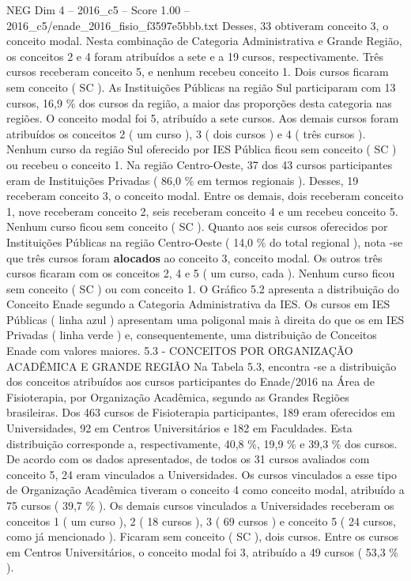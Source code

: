 \begin{textsample}{NEG Dim 4 – 2016\_c5 – Score 1.00 – 2016\_c5/enade\_2016\_fisio\_f3597e5bbb.txt}
Desses, 33 obtiveram conceito 3, o conceito modal.
Nesta combinação de Categoria Administrativa e Grande Região, os conceitos 2 e 4 foram atribuídos a sete e a 19 cursos, respectivamente.
Três cursos receberam conceito 5, e nenhum recebeu conceito 1.
Dois cursos ficaram sem conceito ( SC ).
As Instituições Públicas na região Sul participaram com 13 cursos, 16,9 \% dos cursos da região, a maior das proporções desta categoria nas regiões.
O conceito modal foi 5, atribuído a sete cursos.
Aos demais cursos foram atribuídos os conceitos 2 ( um curso ), 3 ( dois cursos ) e 4 ( três cursos ).
Nenhum curso da região Sul oferecido por IES Pública ficou sem conceito ( SC ) ou recebeu o conceito 1.
Na região Centro-Oeste, 37 dos 43 cursos participantes eram de Instituições Privadas ( 86,0 \% em termos regionais ).
Desses, 19 receberam conceito 3, o conceito modal.
Entre os demais, dois receberam conceito 1, nove receberam conceito 2, seis receberam conceito 4 e um recebeu conceito 5.
Nenhum curso ficou sem conceito ( SC ).
Quanto aos seis cursos oferecidos por Instituições Públicas na região Centro-Oeste ( 14,0 \% do total regional ), nota -se que três cursos foram \textbf{alocados} ao conceito 3, conceito modal.
Os outros três cursos ficaram com os conceitos 2, 4 e 5 ( um curso, cada ).
Nenhum curso ficou sem conceito ( SC ) ou com conceito 1.
O Gráfico 5.2 apresenta a distribuição do Conceito Enade segundo a Categoria Administrativa da IES.
Os cursos em IES Públicas ( linha azul ) apresentam uma poligonal mais à direita do que os em IES Privadas ( linha verde ) e, consequentemente, uma distribuição de Conceitos Enade com valores maiores. 5.3 - CONCEITOS POR ORGANIZAÇÃO ACADÊMICA E GRANDE REGIÃO Na Tabela 5.3, encontra -se a distribuição dos conceitos atribuídos aos cursos participantes do Enade/2016 na Área de Fisioterapia, por Organização Acadêmica, segundo as Grandes Regiões brasileiras.
Dos 463 cursos de Fisioterapia participantes, 189 eram oferecidos em Universidades, 92 em Centros Universitários e 182 em Faculdades.
Esta distribuição corresponde a, respectivamente, 40,8 \%, 19,9 \% e 39,3 \% dos cursos.
De acordo com os dados apresentados, de todos os 31 cursos avaliados com conceito 5, 24 eram vinculados a Universidades.
Os cursos vinculados a esse tipo de Organização Acadêmica tiveram o conceito 4 como conceito modal, atribuído a 75 cursos ( 39,7 \% ).
Os demais cursos vinculados a Universidades receberam os conceitos 1 ( um curso ), 2 ( 18 cursos ), 3 ( 69 cursos ) e conceito 5 ( 24 cursos, como já mencionado ).
Ficaram sem conceito ( SC ), dois cursos.
Entre os cursos em Centros Universitários, o conceito modal foi 3, atribuído a 49 cursos ( 53,3 \% ).

\end{textsample}
